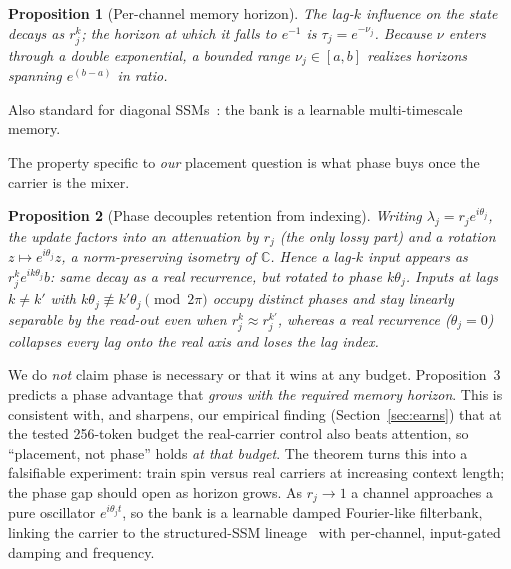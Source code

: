 \documentclass[10pt,twocolumn]{article}
\newtheorem{proposition}{Proposition}
\begin{document}
\begin{proposition}[Per-channel memory horizon]
The lag-$k$ influence on the state decays as $r_j^k$; the horizon at which it falls to $e^{-1}$ is $\tau_j = e^{-\nu_j}$. Because $\nu$ enters through a double exponential, a bounded range $\nu_j\in[a,b]$ realizes horizons spanning $e^{(b-a)}$ in ratio.
\end{proposition}
\noindent Also standard for diagonal SSMs~\cite{gu2022s4d}: the bank is a learnable multi-timescale memory.

The property specific to \emph{our} placement question is what phase buys once the carrier is the mixer.
\begin{proposition}[Phase decouples retention from indexing]
Writing $\lambda_j=r_j e^{i\theta_j}$, the update factors into an attenuation by $r_j$ (the only lossy part) and a rotation $z\mapsto e^{i\theta_j}z$, a norm-preserving isometry of $\mathbb{C}$. Hence a lag-$k$ input appears as $r_j^k e^{ik\theta_j}b$: same decay as a real recurrence, but rotated to phase $k\theta_j$. Inputs at lags $k\neq k'$ with $k\theta_j\not\equiv k'\theta_j \pmod{2\pi}$ occupy distinct phases and stay linearly separable by the read-out even when $r_j^k\approx r_j^{k'}$, whereas a real recurrence ($\theta_j=0$) collapses every lag onto the real axis and loses the lag index.
\end{proposition}
\noindent We do \emph{not} claim phase is necessary or that it wins at any budget. Proposition~3 predicts a phase advantage that \emph{grows with the required memory horizon}. This is consistent with, and sharpens, our empirical finding (Section~\ref{sec:earns}) that at the tested 256-token budget the real-carrier control also beats attention, so ``placement, not phase'' holds \emph{at that budget}. The theorem turns this into a falsifiable experiment: train spin versus real carriers at increasing context length; the phase gap should open as horizon grows. As $r_j\to1$ a channel approaches a pure oscillator $e^{i\theta_j t}$, so the bank is a learnable damped Fourier-like filterbank, linking the carrier to the structured-SSM lineage~\cite{gu2022s4,gu2022s4d} with per-channel, input-gated damping and frequency.
\end{document}
